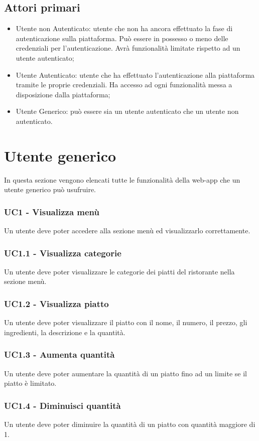 \subsection{Attori primari}
\begin{itemize}
    \item Utente non Autenticato: utente che non ha ancora effettuato la fase di autenticazione sulla piattaforma. Può essere in possesso o meno delle credenziali per l'autenticazione. Avrà funzionalità limitate rispetto ad un utente autenticato;
    \item Utente Autenticato: utente che ha effettuato l'autenticazione alla piattaforma tramite le proprie credenziali. Ha accesso ad ogni funzionalità messa a disposizione dalla piattaforma;
    \item  Utente Generico: può essere sia un utente autenticato che un utente non autenticato.
\end{itemize}
\section{Utente generico}
In questa sezione vengono elencati tutte le funzionalità della web-app che un utente generico può usufruire.
\subsubsection{UC1 - Visualizza menù}
Un utente deve poter accedere alla sezione menù ed visualizzarlo correttamente.
\subsubsection{UC1.1 - Visualizza categorie}
Un utente deve poter visualizzare le categorie dei piatti del ristorante nella sezione menù.
\subsubsection{UC1.2 - Visualizza piatto}
Un utente deve poter visualizzare il piatto con il nome, il numero, il prezzo, gli ingredienti, la descrizione e la quantità.
\subsubsection{UC1.3 - Aumenta quantità}
Un utente deve poter aumentare la quantità di un piatto fino ad un limite se il piatto è limitato.
\subsubsection{UC1.4 - Diminuisci quantità}
Un utente deve poter diminuire la quantità di un piatto con quantità maggiore di 1.
